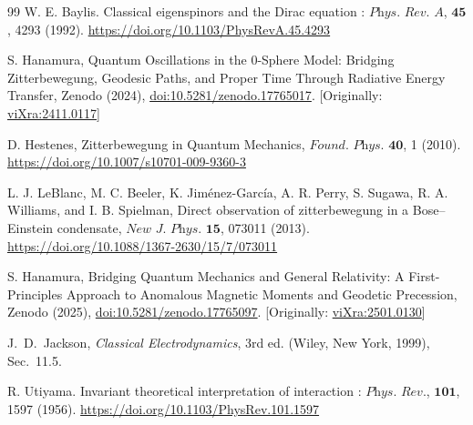 \documentclass[%
 reprint,
 amsmath,amssymb,
 aps,
]{revtex4-1}
\numberwithin{equation}{section}%
\begin{document}
\begin{thebibliography}{99}
 W. E. Baylis. Classical eigenspinors and the Dirac equation : $\textit{Phys. Rev. A}$, $\textbf{45}$, 4293 (1992). \href{https://doi.org/10.1103/PhysRevA.45.4293}{https://doi.org/10.1103/PhysRevA.45.4293}

S. Hanamura, Quantum Oscillations in the 0-Sphere Model: Bridging Zitterbewegung, Geodesic Paths, and Proper Time Through Radiative Energy Transfer, Zenodo (2024), \href{https://doi.org/10.5281/zenodo.17765017}{doi:10.5281/zenodo.17765017}. [Originally: \href{https://vixra.org/abs/2411.0117}{viXra:2411.0117}]

 D. Hestenes, 
Zitterbewegung in Quantum Mechanics, 
$\textit{Found. Phys.}$ $\textbf{40}$, 1 (2010). \href{https://doi.org/10.1007/s10701-009-9360-3}{https://doi.org/10.1007/s10701-009-9360-3}

 L. J. LeBlanc, M. C. Beeler, K. Jiménez-García, A. R. Perry, S. Sugawa, 
R. A. Williams, and I. B. Spielman, 
Direct observation of zitterbewegung in a Bose–Einstein condensate, 
$\textit{New J. Phys.}$ $\textbf{15}$, 073011 (2013). \href{https://doi.org/10.1088/1367-2630/15/7/073011}{https://doi.org/10.1088/1367-2630/15/7/073011}

S. Hanamura, Bridging Quantum Mechanics and General Relativity: A First-Principles Approach to Anomalous Magnetic Moments and Geodetic Precession, Zenodo (2025), \href{https://doi.org/10.5281/zenodo.17765097}{doi:10.5281/zenodo.17765097}. [Originally: \href{https://vixra.org/abs/2501.0130}{viXra:2501.0130}]

 J.~D.~Jackson, \textit{Classical Electrodynamics}, 3rd ed. (Wiley, New York, 1999), Sec.~11.5.

 R. Utiyama. Invariant theoretical interpretation of interaction : $\textit{Phys. Rev.}$, $\textbf{101}$, 1597 (1956). \href{https://doi.org/10.1103/PhysRev.101.1597}{https://doi.org/10.1103/PhysRev.101.1597}

\end{thebibliography}

\end{document}
